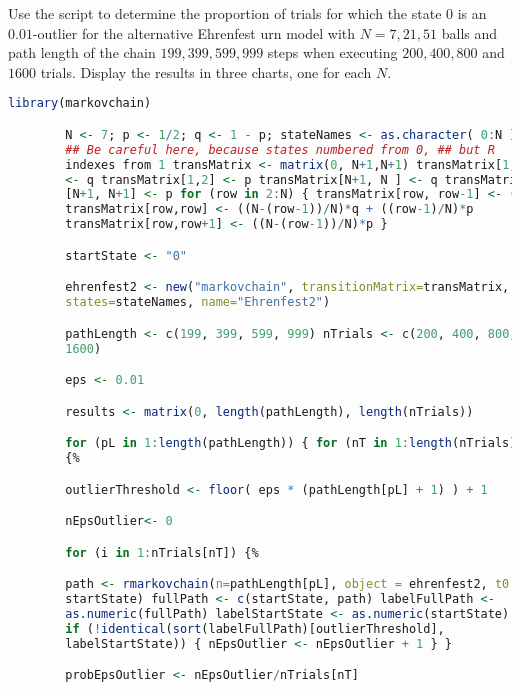 \documentclass[12pt]{article}
\begin{document}
\begin{exercise}
    Use the script to determine the proportion of trials for which the
    state \( 0 \) is an \( 0.01 \)-outlier for the alternative Ehrenfest
    urn model with \( N = 7, 21, 51 \) balls and path length of the
    chain \( 199, 399, 599, 999 \) steps when executing \( 200, 400, 800
    \) and \( 1600 \) trials.  Display the results in three charts, one
    for each \( N \).
\end{exercise}
\begin{solution}

    \begin{lstlisting}[language=R]
        library(markovchain)

        N <- 7; p <- 1/2; q <- 1 - p; stateNames <- as.character( 0:N )
        ## Be careful here, because states numbered from 0, ## but R
        indexes from 1 transMatrix <- matrix(0, N+1,N+1) transMatrix[1,1]
        <- q transMatrix[1,2] <- p transMatrix[N+1, N ] <- q transMatrix
        [N+1, N+1] <- p for (row in 2:N) { transMatrix[row, row-1] <- ((row-1)/N)*q
        transMatrix[row,row] <- ((N-(row-1))/N)*q + ((row-1)/N)*p
        transMatrix[row,row+1] <- ((N-(row-1))/N)*p }

        startState <- "0"

        ehrenfest2 <- new("markovchain", transitionMatrix=transMatrix,
        states=stateNames, name="Ehrenfest2")

        pathLength <- c(199, 399, 599, 999) nTrials <- c(200, 400, 800,
        1600)

        eps <- 0.01

        results <- matrix(0, length(pathLength), length(nTrials))

        for (pL in 1:length(pathLength)) { for (nT in 1:length(nTrials))
        {%

        outlierThreshold <- floor( eps * (pathLength[pL] + 1) ) + 1

        nEpsOutlier<- 0

        for (i in 1:nTrials[nT]) {%

        path <- rmarkovchain(n=pathLength[pL], object = ehrenfest2, t0 =
        startState) fullPath <- c(startState, path) labelFullPath <-
        as.numeric(fullPath) labelStartState <- as.numeric(startState)
        if (!identical(sort(labelFullPath)[outlierThreshold],
        labelStartState)) { nEpsOutlier <- nEpsOutlier + 1 } }

        probEpsOutlier <- nEpsOutlier/nTrials[nT]


\end{lstlisting}
\end{solution}
\end{document}
